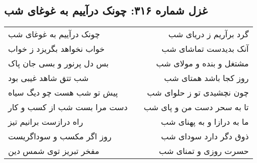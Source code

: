 \begin{center}
\section*{غزل شماره ۳۱۶: چونک درآییم به غوغای شب}
\label{sec:0316}
\begin{longtable}{l p{0.5cm} r}
چونک درآییم به غوغای شب
&&
گرد برآریم ز دریای شب
\\
خواب نخواهد بگریزد ز خواب
&&
آنک بدیدست تماشای شب
\\
بس دل پرنور و بسی جان پاک
&&
مشتغل و بنده و مولای شب
\\
شب تتق شاهد غیبی بود
&&
روز کجا باشد همتای شب
\\
پیش تو شب هست چو دیگ سیاه
&&
چون نچشیدی تو ز حلوای شب
\\
دست مرا بست شب از کسب و کار
&&
تا به سحر دست من و پای شب
\\
راه درازست برانیم تیز
&&
ما به درازا و به پهنای شب
\\
روز اگر مکسب و سوداگریست
&&
ذوق دگر دارد سودای شب
\\
مفخر تبریز توی شمس دین
&&
حسرت روزی و تمنای شب
\\
\end{longtable}
\end{center}

